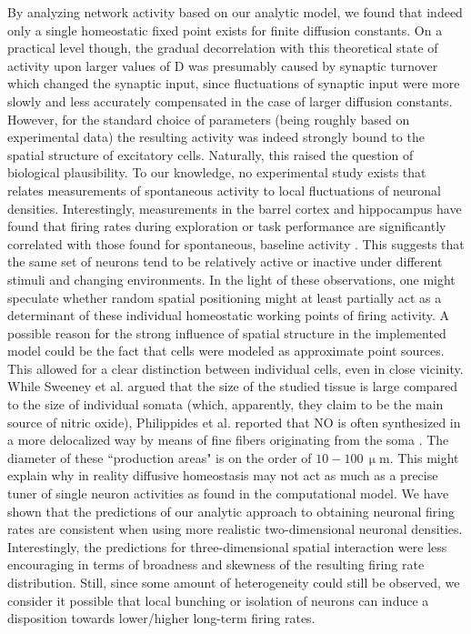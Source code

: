 \documentclass[10pt,letterpaper]{article}
\begin{document}
By analyzing network activity based on our analytic model, we found that indeed only a single homeostatic fixed point exists for finite diffusion constants. On a practical level though, the gradual decorrelation with this theoretical state of activity upon larger values of $\mathrm{D}$ was presumably caused by synaptic turnover which changed the synaptic input, since fluctuations of synaptic input were more slowly and less accurately compensated in the case of larger diffusion constants. However, for the standard choice of parameters (being roughly based on experimental data) the resulting activity was indeed strongly bound to the spatial structure of excitatory cells. Naturally, this raised the question of biological plausibility. To our knowledge, no experimental study exists that relates measurements of spontaneous activity to local fluctuations of neuronal densities. Interestingly, measurements in the barrel cortex and hippocampus have found that firing rates during exploration or task performance are significantly correlated with those found for spontaneous, baseline activity \cite{OConnor_2010,Mizuseki_2013}. This suggests that the same set of neurons tend to be relatively active or inactive under different stimuli and changing environments. In the light of these observations, one might speculate whether random spatial positioning might at least partially act as a determinant of these individual homeostatic working points of firing activity. A possible reason for the strong influence of spatial structure in the implemented model could be the fact that cells were modeled as approximate point sources. This allowed for a clear distinction between individual cells, even in close vicinity. While Sweeney et al. argued that the size of the studied tissue is large compared to the size of individual somata (which, apparently, they claim to be the main source of nitric oxide), Philippides et al. reported that NO is often synthesized in a more delocalized way by means of fine fibers originating from the soma \cite{Philippides_2005}. The diameter of these ``production areas" is on the order of $\mathrm{10-100\, \upmu m}$. This might explain why in reality diffusive homeostasis may not act as much as a precise tuner of single neuron activities as found in the computational model. We have shown that the predictions of our analytic approach to obtaining neuronal firing rates are consistent when using more realistic two-dimensional neuronal densities. Interestingly, the predictions for three-dimensional spatial interaction were less encouraging in terms of broadness and skewness of the resulting firing rate distribution. Still, since some amount of heterogeneity could still be observed, we consider it possible that local bunching or isolation of neurons can induce a disposition towards lower/higher long-term firing rates.
\end{document}
